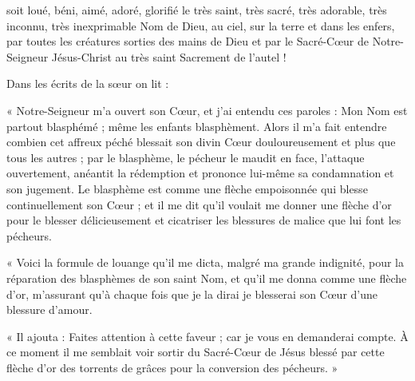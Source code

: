  soit loué, béni, aimé, adoré, glorifié le très saint, très sacré, très adorable, très inconnu, très inexprimable Nom de Dieu, au ciel, sur la terre et dans les enfers, par toutes les créatures sorties des mains de Dieu et par le Sacré-Cœur de Notre-Seigneur Jésus-Christ au très saint Sacrement de l’autel !
\begin{notice}
Dans les écrits de la sœur on lit :

« Notre-Seigneur m’a ouvert son Cœur, et j’ai entendu ces paroles : Mon Nom est partout blasphémé ; même les enfants blasphèment. Alors il m’a fait entendre combien cet affreux péché blessait son divin Cœur douloureusement et plus que tous les autres ; par le blasphème, le pécheur le maudit en face, l’attaque ouvertement, anéantit la rédemption et prononce lui-même sa condamnation et son jugement. Le blasphème est comme une flèche empoisonnée qui blesse continuellement son Cœur ; et il me dit qu’il voulait me donner une flèche d’or pour le blesser délicieusement et cicatriser les blessures de malice que lui font les pécheurs.

« Voici la formule de louange qu’il me dicta, malgré ma grande indignité, pour la réparation des blasphèmes de son saint Nom, et qu’il me donna comme une flèche d’or, m’assurant qu’à chaque fois que je la dirai je blesserai son Cœur d’une blessure d’amour.

« Il ajouta : Faites attention à cette faveur ; car je vous en demanderai compte. À ce moment il me semblait voir sortir du Sacré-Cœur de Jésus blessé par cette flèche d’or des torrents de grâces pour la conversion des pécheurs. »
\end{notice}
\culdelampe
